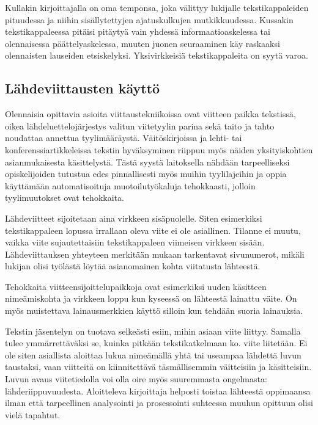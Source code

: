 \documentclass[finnish,gradu]{tktltiki}
\begin{document}
Kullakin kirjoittajalla on oma temponsa, joka välittyy lukijalle
tekstikappaleiden pituudessa ja niihin sisällytettyjen ajatuskulkujen
mutkikkuudessa. Kussakin tekstikappaleessa pitäisi pitäytyä vain yhdessä
informaatioaskelessa tai olennaisessa päättelyaskelessa, muuten juonen
seuraaminen käy raskaaksi olennaisten lauseiden etsiskelyksi. Yksivirkkeisiä
tekstikappaleita on syytä varoa. 



\subsection{Lähdeviittausten käyttö}


Olennaisia opittavia asioita viittaustekniikoissa ovat viitteen paikka
tekstissä, oikea lähdeluettelojärjestys valitun viitetyylin parina sekä
taito ja tahto noudattaa annettua tyylimääräystä. Väitöskirjoissa ja
lehti- tai konferenssiartikkeleissa tekstin hyväksyminen riippuu myös
näiden yksityiskohtien asianmukaisesta käsittelystä. Tästä syystä
laitoksella nähdään tarpeelliseksi opiskelijoiden tutustua edes
pinnallisesti myös muihin tyylilajeihin ja oppia käyttämään
automatisoituja muotoilutyökaluja tehokkaasti, jolloin tyylimuutokset
ovat tehokkaita.

Lähdeviitteet sijoitetaan aina virkkeen sisäpuolelle. Siten esimerkiksi
tekstikappaleen lopussa irrallaan oleva viite ei ole asiallinen. Tilanne
ei muutu, vaikka viite sujautettaisiin tekstikappaleen viimeisen
virkkeen sisään. 
Lähdeviittauksen yhteyteen merkitään mukaan tarkentavat
sivunumerot, mikäli lukijan olisi työlästä löytää asianomainen kohta
viitatusta lähteestä. 


Tehokkaita viitteensijoittelupaikkoja ovat esimerkiksi uuden käsitteen
nimeämiskohta ja virkkeen loppu kun kyseessä on lähteestä lainattu
väite. On myös muistettava lainausmerkkien käyttö silloin kun tehdään
suoria lainauksia.

Tekstin jäsentelyn on tuotava selkeästi esiin, mihin asiaan viite
liittyy. Samalla tulee ymmärrettäväksi se, kuinka pitkään
tekstikatkelmaan ko. viite liitetään. Ei ole siten asiallista aloittaa
lukua nimeämällä yhtä tai useampaa lähdettä luvun taustaksi, vaan
viitteitä on kiinnitettävä täsmällisemmin väitteisiin ja käsitteisiin.
Luvun avaus viitetiedolla voi olla oire myös suuremmasta ongelmasta:
lähderiippuvuudesta. Aloitteleva kirjoittaja helposti toistaa lähteestä
oppimaansa ilman että tarpeellinen analysointi ja prosessointi suhteessa
muuhun opittuun olisi vielä tapahtut.
\end{document}

